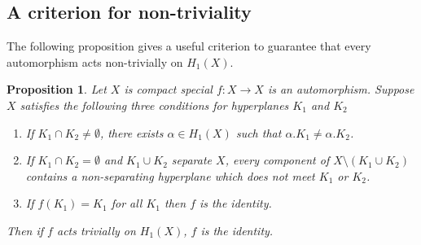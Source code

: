 \documentclass[11pt]{amsart}
\numberwithin{thm}{section}
\newtheorem{proposition}[thm]{Proposition}
\theoremstyle{remark}
\theoremstyle{definition}
\begin{document}
\subsection{A criterion for non-triviality}
The following proposition gives a useful criterion to guarantee that every automorphism acts non-trivially on $H_1(X)$.

\begin{proposition} \label{Criterion}Let $X$ is compact special $f:X\rightarrow X$ is an automorphism.  Suppose $X$ satisfies the following three conditions for hyperplanes $K_1$ and $K_2$
\begin{enumerate}
\item If $K_1\cap K_2\neq \emptyset$, there exists $\alpha\in H_1(X)$ such that $\alpha.K_1\neq \alpha.K_2$.  
\item If $K_1\cap K_2=\emptyset$ and $K_1\cup K_2$ separate $X$, every component of $X\setminus(K_1\cup K_2)$ contains a non-separating hyperplane which does not meet $K_1$ or $K_2$.
\item If $f(K_1)=K_1$ for all $K_1$ then $f$ is the identity.  
\end{enumerate}
Then if $f$ acts trivially on $H_1(X)$, $f$ is the identity.
\end{proposition}
\end{document}
